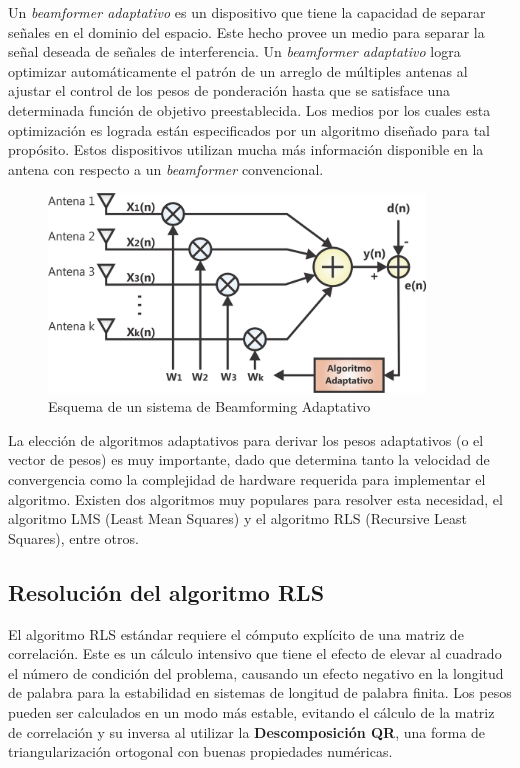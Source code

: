 \documentclass[a4paper]{article}
\begin{document}
Un \textit{beamformer adaptativo} es un dispositivo que tiene la capacidad de separar señales en el dominio del espacio. Este hecho provee un medio para separar la señal deseada de señales de interferencia. Un \textit{beamformer adaptativo} logra optimizar automáticamente el patrón de un arreglo de múltiples antenas al ajustar el control de los pesos de ponderación hasta que se satisface una determinada función de objetivo preestablecida. Los medios por los cuales esta optimización es lograda están especificados por un algoritmo diseñado para tal propósito. Estos dispositivos utilizan mucha más información disponible en la antena con respecto a un \textit{beamformer} convencional.

\begin{figure}[htb!]
        \centering
        \includegraphics[width=10cm]{adaptive_beamforming.png}
        \caption{Esquema de un sistema de Beamforming Adaptativo}
        \label{fig:Adaptive_Beamforming}
\end{figure}

La elección de algoritmos adaptativos para derivar los pesos adaptativos (o el vector de pesos) es muy importante, dado que determina tanto la velocidad de convergencia como la complejidad de hardware requerida para implementar el algoritmo. Existen dos algoritmos muy populares para resolver esta necesidad, el algoritmo LMS (Least Mean Squares) y el algoritmo RLS (Recursive Least Squares), entre otros.

\subsection{Resolución del algoritmo RLS}

El algoritmo RLS estándar requiere el cómputo explícito de una matriz de correlación. Este es un cálculo intensivo que tiene el efecto de elevar al cuadrado el número de condición del problema, causando un efecto negativo en la longitud de palabra para la estabilidad en sistemas de longitud de palabra finita. Los pesos pueden ser calculados en un modo más estable, evitando el cálculo de la matriz de correlación y su inversa al utilizar la \textbf{Descomposición QR}, una forma de triangularización ortogonal con buenas propiedades numéricas. 
\end{document}
